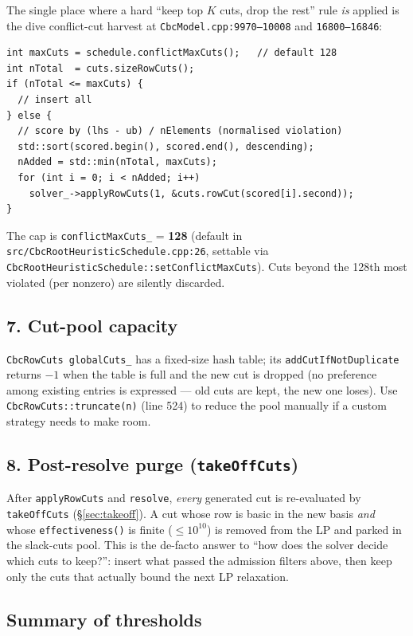 \documentclass[11pt,a4paper]{article}
\begin{document}
The single place where a hard ``keep top $K$ cuts, drop the rest''
rule \emph{is} applied is the dive conflict-cut harvest at
\texttt{CbcModel.cpp:9970--10008} and \texttt{16800--16846}:

\begin{lstlisting}
int maxCuts = schedule.conflictMaxCuts();   // default 128
int nTotal  = cuts.sizeRowCuts();
if (nTotal <= maxCuts) {
  // insert all
} else {
  // score by (lhs - ub) / nElements (normalised violation)
  std::sort(scored.begin(), scored.end(), descending);
  nAdded = std::min(nTotal, maxCuts);
  for (int i = 0; i < nAdded; i++)
    solver_->applyRowCuts(1, &cuts.rowCut(scored[i].second));
}
\end{lstlisting}

The cap is \texttt{conflictMaxCuts\_} = \textbf{128} (default in
\texttt{src/CbcRootHeuristicSchedule.cpp:26}, settable via
\texttt{CbcRootHeuristicSchedule::setConflictMaxCuts}).  Cuts beyond
the 128th most violated (per nonzero) are silently discarded.

\subsection*{7. Cut-pool capacity}

\texttt{CbcRowCuts globalCuts\_} has a fixed-size hash table; its
\texttt{addCutIfNotDuplicate} returns $-1$ when the table is full
and the new cut is dropped (no preference among existing entries is
expressed --- old cuts are kept, the new one loses).  Use
\texttt{CbcRowCuts::truncate(n)} (line 524) to reduce the pool
manually if a custom strategy needs to make room.

\subsection*{8. Post-resolve purge (\texttt{takeOffCuts})}

After \texttt{applyRowCuts} and \texttt{resolve}, \emph{every}
generated cut is re-evaluated by \texttt{takeOffCuts}
(\S\ref{sec:takeoff}).  A cut whose row is basic in the new basis
\emph{and} whose \texttt{effectiveness()} is finite ($\le 10^{10}$)
is removed from the LP and parked in the slack-cuts pool.  This is
the de-facto answer to ``how does the solver decide which cuts to
keep?'': insert what passed the admission filters above, then keep
only the cuts that actually bound the next LP relaxation.

\subsection*{Summary of thresholds}
\end{document}
